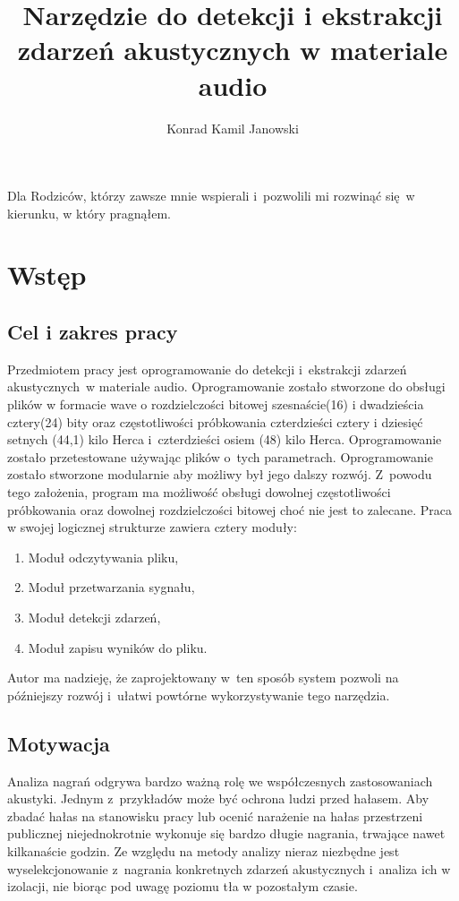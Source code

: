 \documentclass[eng,printmode]{mgr}
\title{Narzędzie do detekcji i ekstrakcji zdarzeń akustycznych w materiale audio}
\author{Konrad Kamil Janowski}
\begin{document}
 
\maketitle %
\dedication{6cm}{Dla Rodziców, którzy zawsze mnie wspierali i~pozwolili mi rozwinąć się~w kierunku, w który pragnąłem.}

\small{\tableofcontents} %

\chapter{Wstęp}
\section{Cel i zakres pracy}
Przedmiotem pracy jest oprogramowanie do detekcji i~ekstrakcji zdarzeń akustycznych~w materiale audio. Oprogramowanie zostało stworzone do obsługi plików w formacie wave o rozdzielczości bitowej szesnaście(16) i dwadzieścia cztery(24) bity oraz częstotliwości próbkowania czterdzieści cztery i dziesięć setnych (44,1) kilo Herca i~czterdzieści osiem (48) kilo Herca. Oprogramowanie zostało przetestowane używając plików o~tych parametrach. Oprogramowanie zostało stworzone modularnie aby możliwy był jego dalszy rozwój. Z~powodu tego założenia, program ma możliwość obsługi dowolnej częstotliwości próbkowania oraz dowolnej rozdzielczości bitowej choć nie jest to zalecane. Praca w swojej logicznej strukturze zawiera cztery moduły:
\begin{enumerate}
\item Moduł odczytywania pliku,
\item Moduł przetwarzania sygnału,
\item Moduł detekcji zdarzeń,
\item Moduł zapisu wyników do pliku.
\end{enumerate}
Autor ma nadzieję, że zaprojektowany w~ten sposób system pozwoli na późniejszy rozwój i~ułatwi powtórne wykorzystywanie tego narzędzia.
\section{Motywacja}
Analiza nagrań odgrywa bardzo ważną rolę we współczesnych zastosowaniach akustyki. Jednym z~przykładów może być ochrona ludzi przed hałasem. Aby zbadać hałas na stanowisku pracy lub ocenić narażenie na hałas przestrzeni publicznej niejednokrotnie wykonuje się bardzo długie nagrania, trwające nawet kilkanaście godzin. Ze względu na metody analizy nieraz niezbędne jest wyselekcjonowanie z~nagrania konkretnych zdarzeń akustycznych i~analiza ich w izolacji, nie biorąc pod uwagę poziomu tła w pozostałym czasie. 
\end{document}
